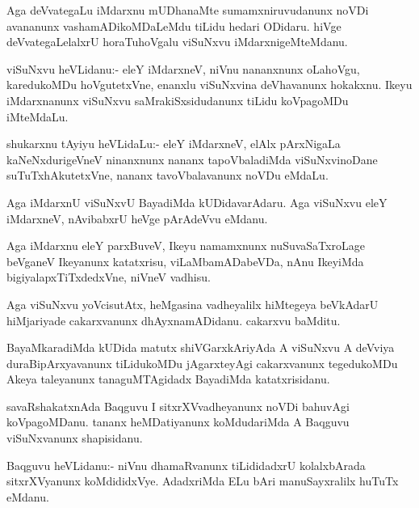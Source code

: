 \documentclass{article}
\begin{document}
\begin{mn}
Aga deVvategaLu iMdarxnu mUDhanaMte sumamxniruvudanunx noVDi avananunx
vashamADikoMDaLeMdu tiLidu hedari ODidaru. hiVge deVvategaLelalxrU
horaTuhoVgalu viSuNxvu iMdarxnigeMteMdanu.
\end{mn}

\begin{mn}%
viSuNxvu heVLidanu:- eleY iMdarxneV, niVnu nananxnunx oLahoVgu,
karedukoMDu hoVgutetxVne, enanxlu viSuNxvina deVhavanunx
hokakxnu. Ikeyu iMdarxnanunx viSuNxvu saMrakiSxsidudanunx tiLidu
koVpagoMDu iMteMdaLu.
\end{mn}

\begin{mn}
shukarxnu tAyiyu heVLidaLu:- eleY iMdarxneV, elAlx pArxNigaLa
kaNeNxdurigeVneV ninanxnunx nananx tapoVbaladiMda viSuNxvinoDane
suTuTxhAkutetxVne, nananx tavoVbalavanunx noVDu eMdaLu.
\end{mn}

\begin{mn}%
Aga iMdarxnU viSuNxvU BayadiMda kUDidavarAdaru. Aga viSuNxvu eleY
iMdarxneV, nAvibabxrU heVge pArAdeVvu eMdanu.
\end{mn}

\begin{mn}
Aga iMdarxnu eleY parxBuveV, Ikeyu namamxnunx nuSuvaSaTxroLage
beVganeV Ikeyanunx katatxrisu, viLaMbamADabeVDa, nAnu IkeyiMda
bigiyalapxTiTxdedxVne, niVneV vadhisu.
\end{mn}

\begin{mn}%
Aga viSuNxvu yoVcisutAtx, heMgasina vadheyalilx hiMtegeya beVkAdarU
hiMjariyade cakarxvanunx dhAyxnamADidanu. cakarxvu baMditu.
\end{mn}

\begin{mn}
BayaMkaradiMda kUDida matutx shiVGarxkAriyAda A viSuNxvu A deVviya
duraBipArxyavanunx tiLidukoMDu jAgarxteyAgi cakarxvanunx tegedukoMDu
Akeya taleyanunx tanaguMTAgidadx BayadiMda katatxrisidanu.
\end{mn}

\begin{mn}
savaRshakatxnAda Baqguvu I sitxrXVvadheyanunx noVDi bahuvAgi
koVpagoMDanu. tananx heMDatiyanunx koMdudariMda A Baqguvu viSuNxvanunx shapisidanu.
\end{mn}

\begin{mn}
Baqguvu heVLidanu:- niVnu dhamaRvanunx tiLididadxrU kolalxbArada
sitxrXVyanunx koMdididxVye. AdadxriMda ELu bAri manuSayxralilx huTuTx eMdanu.
\end{mn}
\end{document}
